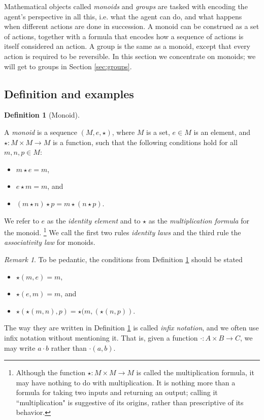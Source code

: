 \documentclass{book}
\def\to{\rightarrow}
\def\taking{\colon}
\theoremstyle{remark}
\newtheorem{remark}[subsubsection]{Remark}
\theoremstyle{definition}
\newtheorem{definition}[subsubsection]{Definition}
\begin{document}
Mathematical objects called {\em monoids} and {\em groups} are tasked with encoding the agent's perspective in all this, i.e. what the agent can do, and what happens when different actions are done in succession. A monoid can be construed as a set of actions, together with a formula that encodes how a sequence of actions is itself considered an action. A group is the same as a monoid, except that every action is required to be reversible. In this section we concentrate on monoids; we will get to groups in Section \ref{sec:groups}.


\subsection{Definition and examples}

\begin{definition}[Monoid]\label{def:monoid}

A {\em monoid} is a sequence $(M,e,\star)$, where $M$ is a set, $e\in M$ is an element, and $\star\taking M\times M\to M$ is a function, such that the following conditions hold for all $m,n,p\in M$:
\begin{itemize}
\item $m\star e=m$,
\item $e\star m=m$, and
\item $(m\star n)\star p=m\star(n\star p)$.
\end{itemize}
We refer to $e$ as the {\em identity element} and to $\star$ as the {\em multiplication formula} for the monoid.
\footnote{Although the function $\star\taking M\times M\to M$ is called the multiplication formula, it may have nothing to do with multiplication. It is nothing more than a formula for taking two inputs and returning an output; calling it ``multiplication" is suggestive of its origins, rather than prescriptive of its behavior.} 
We call the first two rules {\em identity laws} and the third rule the {\em associativity law} for monoids. 

\end{definition}

\begin{remark}

To be pedantic, the conditions from Definition \ref{def:monoid} should be stated 
\begin{itemize}
\item $\star(m,e)=m$,
\item $\star(e,m)=m$, and 
\item $\star(\star(m,n),p)=\star(m,(\star(n,p))$.
\end{itemize} The way they are written in Definition \ref{def:monoid} is called {\em infix notation}, and we often use infix notation without mentioning it. That is, given a function $\cdot\taking A\times B\to C$, we may write $a\cdot b$ rather than $\cdot(a,b)$.

\end{remark}
\end{document}
